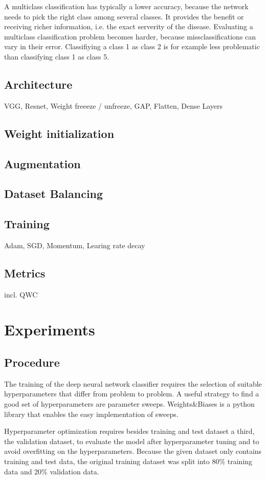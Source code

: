 \documentclass{article}
\begin{document}
A multiclass classification has typically a lower accuracy, because the network needs to pick the right class among 
several classes. It provides the benefit or receiving richer information, i.e. the exact serverity of the disease.
Evaluating a multiclass classification problem becomes harder, because missclassifications can vary in their error.
Classifiying a class 1 as class 2 is for example less problematic than classifying class 1 as class 5.


\subsection{Architecture}
VGG, Resnet, Weight freeeze / unfreeze, GAP, Flatten, Dense Layers
\subsection{Weight initialization}
\subsection{Augmentation}
\subsection{Dataset Balancing}
\subsection{Training}
Adam, SGD, Momentum, Learing rate decay
\subsection{Metrics}
incl. QWC
\section{Experiments}
\subsection{Procedure}
The training of the deep neural network classifier requires the selection of suitable hyperparameters that differ from
problem to problem. A useful strategy to find a good set of hyperparameters are parameter sweeps. Weights\&Biases is a 
python library that enables the easy implementation of sweeps. 

Hyperparameter optimization requires besides training and test dataset a third, the validation dataset, to evaluate the
model after hyperparameter tuning and to avoid overfitting on the hyperparameters. Because the given dataset only contains 
training and test data, the original training dataset was split into 80\% training data and 20\% validation data.
\end{document}
